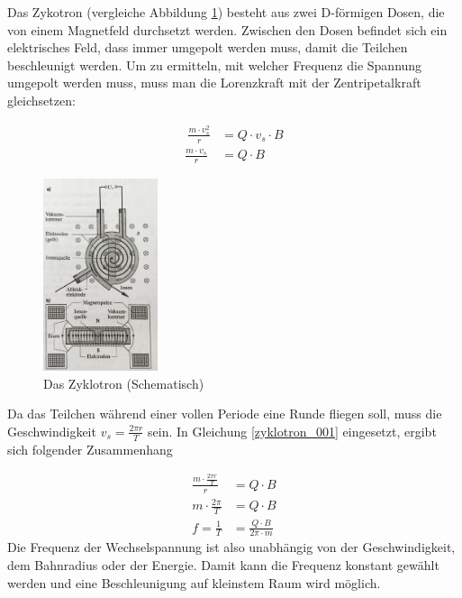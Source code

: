 \documentclass[a4paper]{article}
\begin{document}
			Das Zykotron (vergleiche Abbildung \ref{img:aufbau_zyklotron}) besteht aus zwei D-förmigen Dosen, die von einem Magnetfeld durchsetzt werden. Zwischen den Dosen befindet sich ein elektrisches Feld, dass immer umgepolt werden muss, damit die Teilchen beschleunigt werden. Um zu ermitteln, mit welcher Frequenz die Spannung umgepolt werden muss, muss man die Lorenzkraft mit der Zentripetalkraft gleichsetzen:
			
			\begin{equation}\label{zyklotron_001}
				\begin{aligned}\
				\frac{m\cdot v_s^2}{r} &= Q \cdot v_s\cdot B\\
				\frac{m\cdot v_s}{r} &= Q \cdot B
				\end{aligned}
			\end{equation}
			
						\begin{figure}[H]
				\centering
				\includegraphics[width=0.3\textwidth]{img/aufbau_zyklotron.jpg}
				\caption{Das Zyklotron (Schematisch)}
				\label{img:aufbau_zyklotron}
			\end{figure}
			
			\noindent Da das Teilchen während einer vollen Periode eine Runde fliegen soll, muss die Geschwindigkeit $v_s = \frac{2\pi r}{T}$ sein. In Gleichung \ref{zyklotron_001} eingesetzt, ergibt sich folgender Zusammenhang
			
			\begin{equation}
				\begin{aligned}
				\frac{m\cdot \frac{2\pi r}{T}}{r} &= Q \cdot B\\
				m\cdot \frac{2\pi}{T} &= Q \cdot B\\
				f= \frac{1}{T} &= \frac{Q \cdot B}{2\pi\cdot m  }
				\end{aligned}
			\end{equation}
			Die Frequenz der Wechselspannung ist also unabhängig von der Geschwindigkeit, dem Bahnradius oder der Energie. Damit kann die Frequenz konstant gewählt werden und eine Beschleunigung auf kleinstem Raum wird möglich.
			
\end{document}
